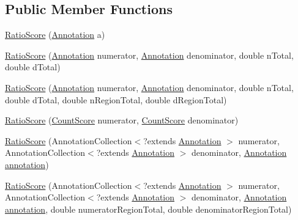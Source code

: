\subsection*{Public Member Functions}
\begin{DoxyCompactItemize}
\item 
\hyperlink{classumms_1_1core_1_1model_1_1score_1_1_ratio_score_a2839dea34e76266ff4ee89afc84b0067}{Ratio\+Score} (\hyperlink{interfaceumms_1_1core_1_1annotation_1_1_annotation}{Annotation} a)
\item 
\hyperlink{classumms_1_1core_1_1model_1_1score_1_1_ratio_score_a56109fa5a5eb99b2c8cf6fab114f52e0}{Ratio\+Score} (\hyperlink{interfaceumms_1_1core_1_1annotation_1_1_annotation}{Annotation} numerator, \hyperlink{interfaceumms_1_1core_1_1annotation_1_1_annotation}{Annotation} denominator, double n\+Total, double d\+Total)
\item 
\hyperlink{classumms_1_1core_1_1model_1_1score_1_1_ratio_score_ab2413dcbf5507765c7f4000d7588552f}{Ratio\+Score} (\hyperlink{interfaceumms_1_1core_1_1annotation_1_1_annotation}{Annotation} numerator, \hyperlink{interfaceumms_1_1core_1_1annotation_1_1_annotation}{Annotation} denominator, double n\+Total, double d\+Total, double n\+Region\+Total, double d\+Region\+Total)
\item 
\hyperlink{classumms_1_1core_1_1model_1_1score_1_1_ratio_score_a794a2229725bbdac247985808547e0f3}{Ratio\+Score} (\hyperlink{classumms_1_1core_1_1model_1_1score_1_1_count_score}{Count\+Score} numerator, \hyperlink{classumms_1_1core_1_1model_1_1score_1_1_count_score}{Count\+Score} denominator)
\item 
\hyperlink{classumms_1_1core_1_1model_1_1score_1_1_ratio_score_af1d338039c3759e76a56e44dde7b47d1}{Ratio\+Score} (Annotation\+Collection$<$?extends \hyperlink{interfaceumms_1_1core_1_1annotation_1_1_annotation}{Annotation} $>$ numerator, Annotation\+Collection$<$?extends \hyperlink{interfaceumms_1_1core_1_1annotation_1_1_annotation}{Annotation} $>$ denominator, \hyperlink{interfaceumms_1_1core_1_1annotation_1_1_annotation}{Annotation} \hyperlink{classumms_1_1core_1_1model_1_1score_1_1_window_score_1_1_abstract_window_score_a455fb02f18f492e611113b9da0a24888}{annotation})
\item 
\hyperlink{classumms_1_1core_1_1model_1_1score_1_1_ratio_score_ae84977919a326b1005fb6e1652601c0e}{Ratio\+Score} (Annotation\+Collection$<$?extends \hyperlink{interfaceumms_1_1core_1_1annotation_1_1_annotation}{Annotation} $>$ numerator, Annotation\+Collection$<$?extends \hyperlink{interfaceumms_1_1core_1_1annotation_1_1_annotation}{Annotation} $>$ denominator, \hyperlink{interfaceumms_1_1core_1_1annotation_1_1_annotation}{Annotation} \hyperlink{classumms_1_1core_1_1model_1_1score_1_1_window_score_1_1_abstract_window_score_a455fb02f18f492e611113b9da0a24888}{annotation}, double numerator\+Region\+Total, double denominator\+Region\+Total)

\end{DoxyCompactItemize}
